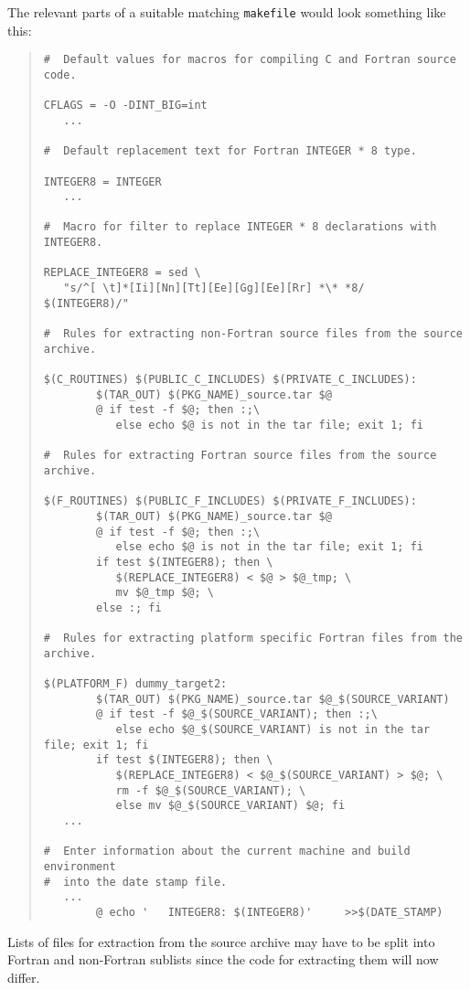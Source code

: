 \documentclass[twoside,11pt]{article}
\renewcommand{\_}{\texttt{\symbol{95}}}
\newcommand{\file}[1]{{\tt #1}}
\newenvironment{squote}{\begin{quote}\begin{small}}{\end{small}\end{quote}}
\begin{document}
The relevant parts of a suitable matching \file{makefile} would look 
something like this:
\begin{squote}
\begin{verbatim}
#  Default values for macros for compiling C and Fortran source code.

CFLAGS = -O -DINT_BIG=int
   ...

#  Default replacement text for Fortran INTEGER * 8 type.

INTEGER8 = INTEGER
   ...

#  Macro for filter to replace INTEGER * 8 declarations with INTEGER8.

REPLACE_INTEGER8 = sed \
   "s/^[ \t]*[Ii][Nn][Tt][Ee][Gg][Ee][Rr] *\* *8/      $(INTEGER8)/"

#  Rules for extracting non-Fortran source files from the source archive.

$(C_ROUTINES) $(PUBLIC_C_INCLUDES) $(PRIVATE_C_INCLUDES):
        $(TAR_OUT) $(PKG_NAME)_source.tar $@
        @ if test -f $@; then :;\
           else echo $@ is not in the tar file; exit 1; fi

#  Rules for extracting Fortran source files from the source archive.

$(F_ROUTINES) $(PUBLIC_F_INCLUDES) $(PRIVATE_F_INCLUDES):
        $(TAR_OUT) $(PKG_NAME)_source.tar $@
        @ if test -f $@; then :;\
           else echo $@ is not in the tar file; exit 1; fi
        if test $(INTEGER8); then \
           $(REPLACE_INTEGER8) < $@ > $@_tmp; \
           mv $@_tmp $@; \
        else :; fi

#  Rules for extracting platform specific Fortran files from the archive.

$(PLATFORM_F) dummy_target2:
        $(TAR_OUT) $(PKG_NAME)_source.tar $@_$(SOURCE_VARIANT)
        @ if test -f $@_$(SOURCE_VARIANT); then :;\
           else echo $@_$(SOURCE_VARIANT) is not in the tar file; exit 1; fi
        if test $(INTEGER8); then \
           $(REPLACE_INTEGER8) < $@_$(SOURCE_VARIANT) > $@; \
           rm -f $@_$(SOURCE_VARIANT); \
           else mv $@_$(SOURCE_VARIANT) $@; fi
   ...

#  Enter information about the current machine and build environment
#  into the date stamp file.
   ...
        @ echo '   INTEGER8: $(INTEGER8)'     >>$(DATE_STAMP)
\end{verbatim}
\end{squote}
Lists of files for extraction from the source archive may have to
be split into Fortran and non-Fortran sublists since the code for
extracting them will now differ.
\end{document}
